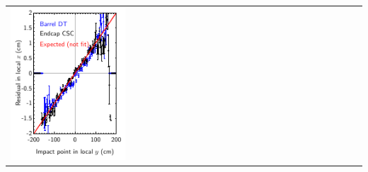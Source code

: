 \documentclass[compress]{beamer}
\begin{document}
\begin{frame}
\begin{center}
\begin{tabular}{p{0.35\linewidth} p{0.35\linewidth} p{0.35\linewidth}}
\begin{minipage}{\linewidth}
	\includegraphics[width=\linewidth]{phiz_xresid_vs_y}
      \end{minipage}
    \end{tabular}
  \end{center}
\end{frame}
\end{document}
